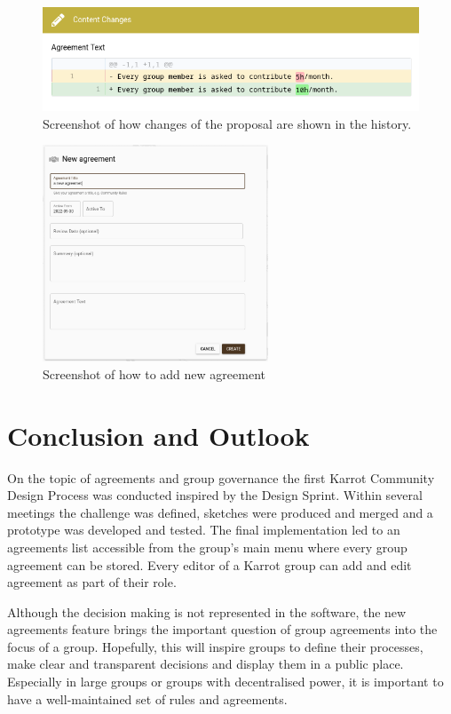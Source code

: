 \documentclass[
	a4paper,%
	11pt,%
	]{article}
\begin{document}
\begin{figure}[p]
	\includegraphics[width=.8\textwidth,
	]{images/changes-view.png}
	\caption{Screenshot of how changes of the proposal are shown in the history.}
	\label{fig:screenshot-changes}
\end{figure}

\begin{figure}[p]
\centering
	\includegraphics[width=0.6\textwidth,
	]{images/create_agreement.png}
	\caption{Screenshot of how to add new agreement}
	\label{fig:screenshot-create-agreement}
\end{figure}



\section{Conclusion and Outlook} \label{sec:outlook}

On the topic of agreements and group governance the first Karrot Community Design Process was conducted inspired by the Design Sprint. Within several meetings the challenge was defined, sketches were produced and merged and a prototype was developed and tested. The final implementation led to an agreements list accessible from the group's main menu where every group agreement can be stored. Every editor of a Karrot group can add and edit agreement as part of their role.

Although the decision making is not represented in the software, the new agreements feature brings the important question of group agreements into the focus of a group. Hopefully, this will inspire groups to define their processes, make clear and transparent decisions and display them in a public place. Especially in large groups or groups with decentralised power, it is important to have a well-maintained set of rules and agreements.
\end{document}
